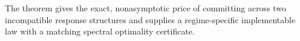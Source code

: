 The theorem gives the exact, nonasymptotic price of committing across two incompatible response structures and supplies a regime-specific implementable law with a matching spectral optimality certificate.